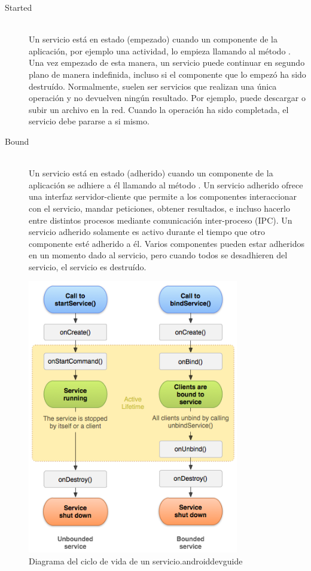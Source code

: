 \begin{description}
    \item[Started] \hfill \\
    Un servicio está en estado  (empezado) cuando un componente de la aplicación, por ejemplo una actividad, lo empieza llamando al método . Una vez empezado de esta manera, un servicio puede continuar en segundo plano de manera indefinida, incluso si el componente que lo empezó ha sido destruído. Normalmente, suelen ser servicios que realizan una única operación y no devuelven ningún resultado. Por ejemplo, puede descargar o subir un archivo en la red. Cuando la operación ha sido completada, el servicio debe pararse a si mismo.
    \item[Bound] \hfill \\
    Un servicio está en estado  (adherido) cuando un componente de la aplicación se adhiere a él llamando al método . Un servicio adherido ofrece una interfaz servidor-cliente que permite a los componentes interaccionar con el servicio, mandar peticiones, obtener resultados, e incluso hacerlo entre distintos procesos mediante comunicación inter-proceso (IPC). Un servicio adherido solamente es activo durante el tiempo que otro componente esté adherido a él. Varios componentes pueden estar adheridos en un momento dado al servicio, pero cuando todos se desadhieren del servicio, el servicio es destruído.

\end{description}

\begin{figure}[h] \centering
    \includegraphics[height=12cm]{graphs/service_lifecycle.png} \caption{Diagrama del ciclo de vida de un servicio.{androiddevguide}}\label{fig:diagrama:ServiceLifecycle}
\end{figure}

